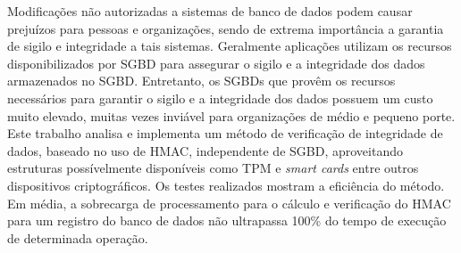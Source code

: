 \begin{resumo}
Modifica\c{c}\~{o}es n\~{a}o autorizadas a sistemas de banco de dados podem causar preju\'{i}zos para pessoas e organiza\c{c}\~{o}es, sendo
de extrema import\^{a}ncia a garantia de sigilo e integridade a tais sistemas. Geralmente aplica\c{c}\~{o}es utilizam os recursos
disponibilizados por \ac{SGBD} para assegurar o sigilo e a integridade dos dados armazenados
no \ac{SGBD}. Entretanto, os \ac{SGBD}s que prov\^{e}m os recursos necess\'{a}rios para garantir o sigilo e a integridade dos dados possuem um custo muito elevado,
muitas vezes invi\'{a}vel para organiza\c{c}\~{o}es de m\'{e}dio e pequeno porte. Este trabalho analisa e implementa um m\'{e}todo de verifica\c{c}\~{a}o de integridade de dados, baseado no uso de \ac{HMAC},
independente de \ac{SGBD}, aproveitando estruturas possívelmente disponíveis como \ac{TPM} e {\it smart cards} entre outros dispositivos criptográficos.
Os testes realizados mostram a efici\^{e}ncia do m\'{e}todo. Em m\'{e}dia, a sobrecarga de processamento para o c\'{a}lculo e verifica\c{c}\~{a}o do \ac{HMAC} para um
registro do banco de dados n\~{a}o ultrapassa 100\% do tempo de execu\c{c}\~{a}o de determinada opera\c{c}\~{a}o.

\end{resumo}

